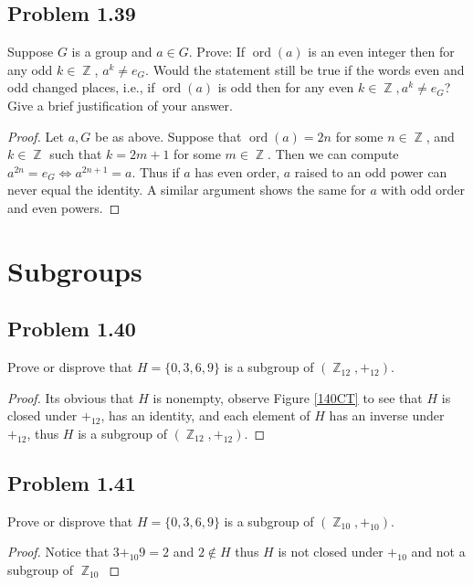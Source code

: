 \documentclass{amsbook}
\DeclareMathOperator{\ord}{\text{ord}}
\DeclareMathOperator{\Z}{\mathbb{Z}}
\begin{document}
			\subsection*{Problem 1.39}
			\label{sub:problem_1_39}
			Suppose $G$ is a group and $a \in G$. 
			Prove: If $\ord(a)$ is an even integer then for any odd $k \in \Z$, $a^{k} \neq e_{G}$. 
			Would the statement still be true if the words even and odd changed places, i.e., if $\ord(a)$ is odd then for any even $k \in \Z, a^{k} \neq e_{G}$? 
			Give a brief justification of your answer.
			\begin{proof}
			Let $a,G$ be as above.
			Suppose that $\ord(a) = 2n$ for some $n \in \Z$, and $k \in \Z$ such that $k = 2m+1$ for some $m \in \Z$.
			Then we can compute $a^{2n} = e_{G} \iff a^{2n+1} = a$.
			Thus if $a$ has even order, $a$ raised to an odd power can never equal the identity.
			A similar argument shows the same for $a$ with odd order and even powers.
			\end{proof}

		\section{Subgroups}
		\label{sec:subgroups}
			\subsection*{Problem 1.40}
			\label{sub:problem_1_40}
			Prove or disprove that $H = \{ 0,3, 6, 9 \}$ is a subgroup of $(\Z_{12}, +_{12})$.
			\begin{proof} Its obvious that $H$ is nonempty, observe Figure \ref{140CT} to see that $H$ is closed under $+_{12}$, has an identity, and each element of $H$ has an inverse under $+_{12}$, thus $H$ is a subgroup of $(\Z_{12}, +_{12})$.
			\end{proof}

			\subsection*{Problem 1.41}
			\label{sub:problem_1_41}
			Prove or disprove that $H = \{ 0,3, 6, 9 \}$ is a subgroup of $(\Z_{10}, +_{10})$.
			\begin{proof} Notice that $3 +_{10} 9 = 2$ and $2 \notin H$ thus $H$ is not closed under $+_{10}$ and not a subgroup of $\Z_{10}$
			\end{proof}
\end{document}

